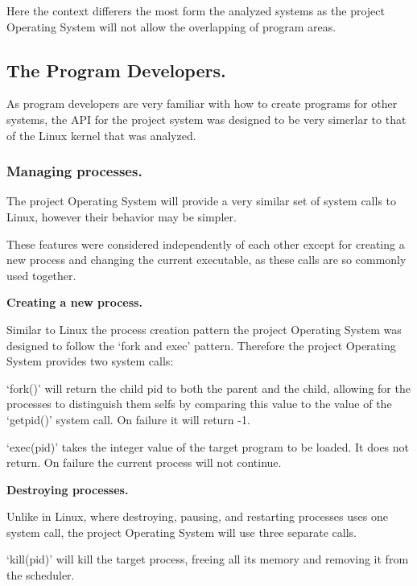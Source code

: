\documentclass[a4paper]{report}
\begin{document}
Here the context differers the most form the analyzed systems as the project Operating System will not allow the overlapping of program areas.



\subsection*{The Program Developers.}

As program developers are very familiar with how to create programs for other systems, the API for the project system was designed to be very simerlar to that of the Linux kernel that was analyzed.

\subsubsection*{Managing processes.}

The project Operating System will provide a very similar set of system calls to Linux, however their behavior may be simpler.

These features were considered independently of each other except for creating a new process and changing the current executable, as these calls are so commonly used together. 

\textbf{Creating a new process.}

Similar to Linux the process creation pattern the project Operating System was designed to follow the `fork and exec' pattern. Therefore the project Operating System provides two system calls:

`fork()' will return the child pid to both the parent and the child, allowing for the processes to distinguish them selfs by comparing this value to the value of the `get\textunderscore pid()' system call. On failure it will return -1.

`exec(pid)' takes the integer value of the target program to be loaded. It does not return. On failure the current process will not continue.

\textbf{Destroying processes.}

Unlike in Linux, where destroying, pausing, and restarting processes uses one system call, the project Operating System will use three separate calls.

`kill(pid)' will kill the target process, freeing all its memory and removing it from the scheduler.
\end{document}
